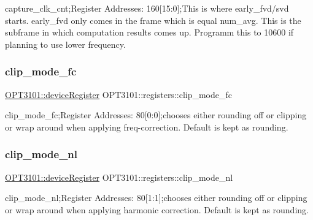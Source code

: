 capture\+\_\+clk\+\_\+cnt;Register Addresses\+: 160\mbox{[}15\+:0\mbox{]};This is where early\+\_\+fvd/svd starts. early\+\_\+fvd only comes in the frame which is equal num\+\_\+avg. This is the subframe in which computation results comes up. Programm this to 10600 if planning to use lower frequency. 

\mbox{\label{class_o_p_t3101_1_1registers_a7f492976fddcfa840372b5e531f7cf86}} 
\subsubsection{\texorpdfstring{clip\+\_\+mode\+\_\+fc}{clip\_mode\_fc}}
{\footnotesize\ttfamily \mbox{\hyperlink{class_o_p_t3101_1_1device_register}{O\+P\+T3101\+::device\+Register}} O\+P\+T3101\+::registers\+::clip\+\_\+mode\+\_\+fc}



clip\+\_\+mode\+\_\+fc;Register Addresses\+: 80\mbox{[}0\+:0\mbox{]};chooses either rounding off or clipping or wrap around when applying freq-\/correction. Default is kept as rounding. 

\mbox{\label{class_o_p_t3101_1_1registers_a50e6410737d9b479ceed94b6521b566d}} 
\subsubsection{\texorpdfstring{clip\+\_\+mode\+\_\+nl}{clip\_mode\_nl}}
{\footnotesize\ttfamily \mbox{\hyperlink{class_o_p_t3101_1_1device_register}{O\+P\+T3101\+::device\+Register}} O\+P\+T3101\+::registers\+::clip\+\_\+mode\+\_\+nl}



clip\+\_\+mode\+\_\+nl;Register Addresses\+: 80\mbox{[}1\+:1\mbox{]};chooses either rounding off or clipping or wrap around when applying harmonic correction. Default is kept as rounding. 

\mbox{\label{class_o_p_t3101_1_1registers_ae4e6e6a2afdbe9aa78d7bef9f0937eb7}} 
